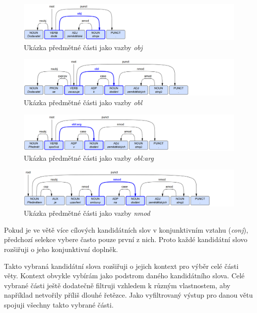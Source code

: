 \documentclass[thesis=M,czech]{FITthesis}[2019/12/23]
\begin{document}
\begin{figure}\centering
	\includegraphics[width=1\textwidth]{images/obj_example.png}
	\caption{Ukázka předmětné části jako vazby \textit{obj}}\label{fig:objexample}
\end{figure}
\begin{figure}\centering
	\includegraphics[width=1\textwidth]{images/obl_example.png}
	\caption{Ukázka předmětné části jako vazby \textit{obl}}\label{fig:oblexample}
\end{figure}
\begin{figure}\centering
	\includegraphics[width=1\textwidth]{images/oblarg_example.png}
	\caption{Ukázka předmětné části jako vazby \textit{obl:arg}}\label{fig:oblargexample}
\end{figure}
\begin{figure}\centering
	\includegraphics[width=1\textwidth]{images/nmod_example.png}
	\caption{Ukázka předmětné části jako vazby \textit{nmod}}\label{fig:nmodexample}
\end{figure}



Pokud je ve větě více cílových kandidátních slov v konjunktivním vztahu (\textit{conj}), předchozí selekce vybere často pouze první z nich. Proto každé kandidátní slovo rozšiřuji o jeho konjunktivní doplněk.

Takto vybraná kandidátní slova rozšiřuji o jejich kontext pro výběr celé části věty. Kontext obvykle vybírám jako podstrom daného kandidátního slova. Celé vybrané části ještě dodatečně filtruji vzhledem k různým vlastnostem, aby například netvořily příliš dlouhé řetězce. Jako vyfiltrovaný výstup pro danou větu spojuji všechny takto vybrané části.
\end{document}
